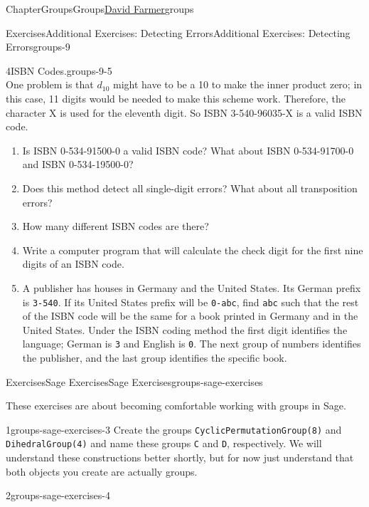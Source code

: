 \documentclass[oneside,10pt,]{book}
\newcommand{\mono}[1]{\texttt{#1}}
\numberwithin{equation}{section}
\begin{document}
\begin{chapterptx}{Chapter}{Groups}{}{Groups}{\hyperlink{dfarmer}{David Farmer}}{}{groups}
\begin{exercises-section}{Exercises}{Additional Exercises: Detecting Errors}{}{Additional Exercises: Detecting Errors}{}{}{groups-9}
\begin{divisionexercise}{4}{ISBN Codes.}{}{groups-9-5}
\begin{equation*}
\end{equation*}
One problem is that \(d_{10}\) might have to be a 10 to make the inner product zero; in this case, 11 digits would be  needed to make this scheme work.  Therefore, the character X is used for the eleventh digit.  So ISBN 3-540-96035-X is a valid ISBN code.%
%
\begin{enumerate}[label={(\alph*)}]
\item{}Is ISBN 0-534-91500-0 a valid ISBN code?  What about ISBN 0-534-91700-0 and ISBN 0-534-19500-0?%
\item{}Does this method detect all single-digit errors?  What about all transposition errors?%
\item{}How many different ISBN codes are there?%
\item{}Write a computer program that will calculate the check digit for the first nine digits of an ISBN code.%
\item{}A publisher has houses in Germany and the United States.  Its German prefix is \mono{3-540}.  If its United States prefix will be \mono{0-abc}, find \mono{abc} such that the rest of the ISBN code will be the same for a book printed in Germany and in the United States. Under the ISBN coding method the first digit identifies the language; German is \mono{3} and English is \mono{0}.  The next group of numbers identifies the publisher, and the last group identifies the specific book.%
\end{enumerate}
\end{divisionexercise}%
\end{exercises-section}
%
%
\typeout{************************************************}
\typeout{************************************************}
%
\begin{exercises-section}{Exercises}{Sage Exercises}{}{Sage Exercises}{}{}{groups-sage-exercises}
\begin{introduction}{}%
These exercises are about becoming comfortable working with groups in Sage.%
\end{introduction}%
\begin{divisionexercise}{1}{}{}{groups-sage-exercises-3}%
Create the groups \mono{CyclicPermutationGroup(8)} and \mono{DihedralGroup(4)} and name these groups \mono{C} and \mono{D}, respectively.  We will understand these constructions better shortly, but for now just understand that both objects you create are actually groups.%
\end{divisionexercise}%
\begin{divisionexercise}{2}{}{}{groups-sage-exercises-4}%

\end{divisionexercise}
\end{exercises-section}
\end{chapterptx}
\end{document}
